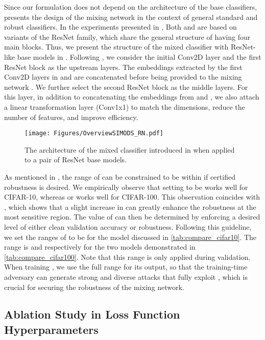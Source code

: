 \documentclass[11pt, letterpaper]{article}
\theoremstyle{plain}
\theoremstyle{definition}
\begin{document}
Since our formulation does not depend on the architecture of the base classifiers,  presents the design of the mixing network in the context of general standard and robust classifiers. In the experiments presented in , Both  and  are based on variants of the ResNet family, which share the general structure of having four main blocks. Thus, we present the structure of the mixed classifier with ResNet-like base models in . Following \citep{Metzen17}, we consider the initial Conv2D layer and the first ResNet block as the upstream layers. The embeddings extracted by the first Conv2D layers in  and  are concatenated before being provided to the mixing network . We further select the second ResNet block as the middle layers. For this layer, in addition to concatenating the embeddings from  and , we also attach a linear transformation layer (Conv1x1) to match the dimensions, reduce the number of features, and improve efficiency.

\begin{figure}[!tb]
    \centering
    \texttt{[image: Figures/OverviewSIMODS\_RN.pdf]}
    \caption{The architecture of the mixed classifier introduced in  when applied to a pair of ResNet base models.}
    \label{fig:mixing_arch_rn}
\end{figure}

As mentioned in , the range of  can be constrained to be within  if certified robustness is desired. We empirically observe that setting  to be  works well for CIFAR-10, whereas  or  works well for CIFAR-100. This observation coincides with , which shows that a slight increase in  can greatly enhance the robustness at the most sensitive region. The value of  can then be determined by enforcing a desired level of either clean validation accuracy or robustness. Following this guideline, we set the ranges of  to be  for the model discussed in \cref{tab:compare_cifar10}. The range is  and  respectively for the two models demonstrated in \cref{tab:compare_cifar100}. Note that this range is only applied during validation. When training , we use the full  range for its output, so that the training-time adversary can generate strong and diverse attacks that fully exploit , which is crucial for securing the robustness of the mixing network. 


\subsection{Ablation Study in Loss Function Hyperparameters} \label{sec:loss_abla}
\end{document}
